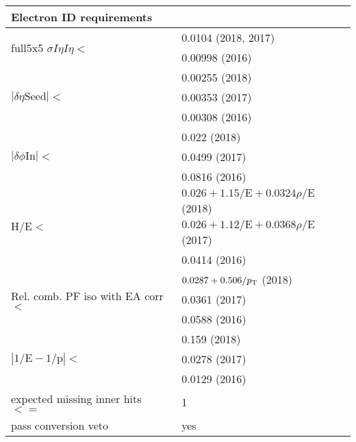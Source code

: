 \begin{table}
\noindent \centering{}
\label{e_tight_id}
\begin{tabular}{ll}
\hline
Electron ID requirements\\
\hline 
\multirow{2}{*}{full5x5 $\sigma I \eta I\eta <$}     & 0.0104 (2018, 2017)                \\
                                                     & 0.00998 (2016)                     \\[2mm]
\multirow{3}{*}{$|\delta\eta \mathrm{Seed}| < $}     & 0.00255 (2018)                     \\
                                                     & 0.00353 (2017)                     \\
                                                     & 0.00308 (2016)                     \\[2mm]
\multirow{3}{*}{$|\delta\phi \mathrm{In}| < $}       & 0.022 (2018)                       \\
                                                     & 0.0499 (2017)                      \\
                                                     & 0.0816 (2016)                      \\[2mm]
\multirow{3}{*}{$\mathrm{H/E} <$}                    & $0.026+1.15/\mathrm{E}+0.0324\rho/\mathrm{E}$ (2018)  \\
& $0.026+1.12/\mathrm{E}+0.0368\rho/\mathrm{E}$ (2017)  \\
& 0.0414 (2016)  \\[2mm]
\multirow{3}{*}{Rel. comb. PF iso with EA corr $<$}  & $0.0287+0.506/p_{\mathrm{T}}$ (2018)         \\
                                                     & 0.0361 (2017)          \\
                                                     & 0.0588 (2016)          \\[2mm]
\multirow{3}{*}{$|1/\mathrm{E}-1/\mathrm{p}|<$}   & 0.159 (2018)              \\
                                                  & 0.0278 (2017)             \\
                                                  & 0.0129 (2016)             \\[2mm]
expected missing inner hits $<=$ & 1                            \\[2mm]
pass conversion veto	         & yes                          \\[2mm]
\hline
\end{tabular}
\end{table}